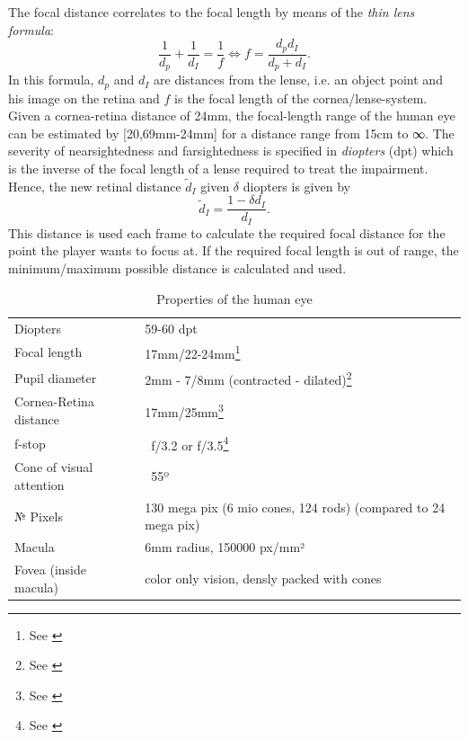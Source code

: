 \documentclass{acm_proc_article-sp}
\begin{document}
The focal distance correlates to the focal length by means of the \emph{thin lens formula}:
\begin{equation}
    \frac{1}{d_p} + \frac{1}{d_I} = \frac{1}{f} \Leftrightarrow f = \frac{d_p d_I}{d_p + d_I}.
\end{equation}
In this formula, $d_p$ and $d_I$ are distances from the lense, i.e. an object point and his image on the retina and $f$ is the focal length of the cornea/lense-system.
Given a cornea-retina distance of 24mm, the focal-length range of the human eye can be estimated by [20,69mm-24mm] for a distance range from 15cm to ∞.
%
The severity of nearsightedness and farsightedness is specified in \emph{diopters} (dpt) which is the inverse of the focal length of a lense required to treat the impairment.
Hence, the new retinal distance $\tilde d_I$ given $\delta$ diopters is given by
\begin{equation}
    \tilde d_I = \frac{1 - \delta d_I}{d_I}.
\end{equation}
This distance is used each frame to calculate the required focal distance for the point the player wants to focus at.
If the required focal length is out of range, the minimum/maximum possible distance is calculated and used.
%
\begin{table}
    \centering
    \begin{tabular}{ll}
        Diopters                & 59-60 dpt \\
        Focal length            & 17mm/22-24mm\footnote{See \cite{eye-focal, eyeascamera}} \\
        Pupil diameter          & 2mm - 7/8mm (contracted - dilated)\footnote{See \cite{eyeascamera}} \\
        Cornea-Retina distance  & 17mm/25mm\footnote{See \cite{eyeascamera}} \\
        f-stop                  & ~f/3.2 or f/3.5\footnote{See \cite{eyeascamera}} \\
        Cone of visual attention& ~55º \\
        № Pixels                & 130 mega pix (6 mio cones, 124 rods) (compared to 24 mega pix) \\
        Macula                  & 6mm radius, 150000 px/mm²\\
        Fovea (inside macula)   & color only vision, densly packed with cones \\
    \end{tabular}
    \caption{Properties of the human eye}
    \label{tab:eyeproperties}
\end{table}
\end{document}
